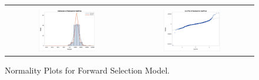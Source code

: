 \documentclass[11pt]{scrartcl} %
\begin{document}
\begin{figure}[H] %
	\centering
	\begin{tabular}{p{} p{}}
\hline	
	\multicolumn{1}{|c}{} &  \multicolumn{1}{c|}{} \\
		\multicolumn{1}{|c}{\includegraphics[width=0.48\textwidth]{../graphics/A2FWHist}} &
		\multicolumn{1}{c|}{\includegraphics[width=0.48\textwidth]{../graphics/A2FWqq}}\\
		\hline
	\end{tabular}		
	\caption{Normality Plots for Forward Selection Model.}
	\label{fig:A2FWQQ}
\end{figure}
\end{document}
